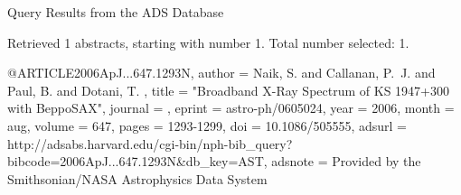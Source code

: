 Query Results from the ADS Database


Retrieved 1 abstracts, starting with number 1.  Total number selected: 1.

@ARTICLE{2006ApJ...647.1293N,
   author = {{Naik}, S. and {Callanan}, P.~J. and {Paul}, B. and {Dotani}, T.
	},
    title = "{Broadband X-Ray Spectrum of KS 1947+300 with BeppoSAX}",
  journal = {\apj},
   eprint = {astro-ph/0605024},
     year = 2006,
    month = aug,
   volume = 647,
    pages = {1293-1299},
      doi = {10.1086/505555},
   adsurl = {http://adsabs.harvard.edu/cgi-bin/nph-bib_query?bibcode=2006ApJ...647.1293N&db_key=AST},
  adsnote = {Provided by the Smithsonian/NASA Astrophysics Data System}
}


